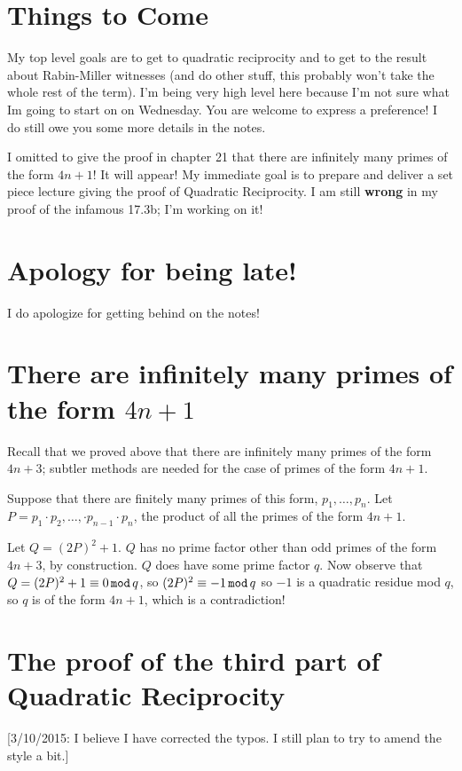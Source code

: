 \documentclass[12pt]{article}
\begin{document}
\section{Things to Come}
My top level goals are to get to quadratic reciprocity and to get to the result about Rabin-Miller witnesses (and do other stuff, this probably won't take the whole rest of the term).  I'm being very high level here because I'm not sure what Im going to start on on Wednesday.   You are welcome to express a preference!   I do still owe you some more details in the notes.

I omitted to give the proof in chapter 21 that there are infinitely many primes of the form $4n+1$!  It will appear!   My immediate goal is to prepare and deliver a set piece lecture giving the proof of Quadratic Reciprocity.  I am still {\bf wrong}
in my proof of the infamous 17.3b; I'm working on it!

\section {Apology for being late!}

I do apologize for getting behind on the notes!

\section{There are infinitely many primes of the form $4n+1$}

Recall that we proved above that there are infinitely many primes of the form $4n+3$;  subtler methods are needed for the case of primes of the form $4n+1$.

Suppose that there are finitely many primes of this form, $p_1,\ldots,p_n$.   Let $P=p_1\cdot p_2 ,\ldots,\cdot p_{n-1}\cdot p_n$, the product of all the primes of the form $4n+1$.

Let $Q=(2P)^2+1$.  $Q$ has no prime factor other than odd primes of the form $4n+3$, by construction.   $Q$ does have some prime factor $q$.   Now observe that $Q=(2P)^2+1 \equiv 0 \,{\tt mod} \,q$, so $(2P)^2 \equiv -1 \,{\tt mod} \,q$ so $-1$ is a quadratic residue mod $q$, so $q$ is of the form $4n+1$, which is a contradiction!


\section{The proof of the third part of Quadratic Reciprocity}

[3/10/2015:  I believe I have corrected the typos.  I still plan to try to amend the style a bit.]
\end{document}
